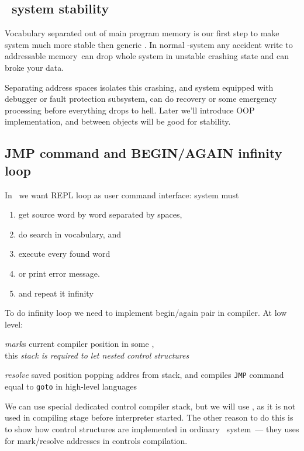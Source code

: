 \subsection{\F\ system stability}

Vocabulary separated out of main program memory is our first step to make
system much more stable then generic \F. In normal \F-system any accident write
to addressable memory\ can drop whole system in unstable crashing state and can broke your data.

Separating address spaces isolates this crashing, and system equipped with
debugger or fault protection subsystem, can do recovery or some emergency
processing before everything drops to hell.
Later we'll introduce OOP implementation, and  between
objects will be good for stability.

\subsection{JMP command and BEGIN/AGAIN infinity loop}

In \F\ we want REPL loop as user command interface:
system must
\begin{enumerate}[nosep]
\item get source word by word separated by spaces,
\item do search in vocabulary, and 
\item execute every found word 
\item or print error message.
\item and repeat it infinity
\end{enumerate}
\noindent
To do infinity loop we need to implement begin/again pair in compiler.
At low level:
\begin{description}[nosep]
\item[begin] \emph{mark}s current compiler position in some
		,\\
		this \emph{stack is required to let nested control structures}
	\item[again] \emph{resolve} saved position popping addres from stack, and 
		compiles \verb|JMP| command equal to \verb|goto| in high-level languages
\end{description}

We can use special dedicated control compiler stack, but we will use
, as it is not used in compiling stage before interpreter
started. The
other reason to do this is to show how control structures are implemented in 
ordinary \F\ system\ --- they uses  for mark/resolve addresses
in controls compilation.

